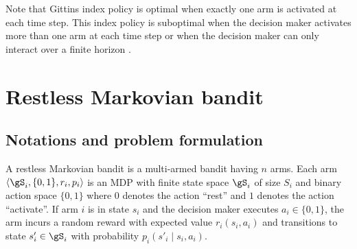 Note that Gittins index policy is optimal when exactly one arm is activated at each time step.
This index policy is suboptimal when the decision maker activates more than one arm at each time step or when the decision maker can only interact over a finite horizon \cite{gittins2011multi}.


\section{Restless Markovian bandit}
\label{ch:mb:sec:restless}



\subsection{Notations and problem formulation}
\label{ssec:restless_formul}

A restless Markovian bandit is a multi-armed bandit having $n$ arms.
Each arm $\langle\gS_i, \{0,1\}, r_i, p_i\rangle$ is an MDP with finite state space $\gS_i$ of size $S_i$ and binary action space $\{0,1\}$ where $0$ denotes the action ``rest'' and $1$ denotes the action ``activate''.
If arm $i$ is in state $s_i$ and the decision maker executes $a_i\in\{0,1\}$, the arm incurs a random reward with expected value $r_i(s_i,a_i)$ and transitions to state $s'_i\in\gS_i$ with probability $p_i(s'_i\mid s_i,a_i)$.

